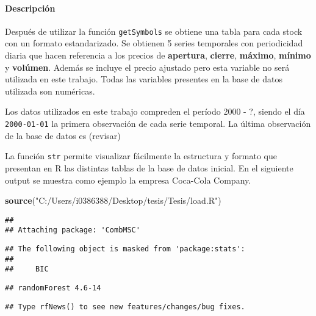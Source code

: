 \documentclass[]{article}
\newenvironment{Shaded}{\begin{snugshade}}{\end{snugshade}}
\newcommand{\KeywordTok}[1]{\textcolor[rgb]{0.13,0.29,0.53}{\textbf{#1}}}
\newcommand{\NormalTok}[1]{#1}
\newcommand{\StringTok}[1]{\textcolor[rgb]{0.31,0.60,0.02}{#1}}
\let\oldparagraph\paragraph
\renewcommand{\paragraph}[1]{\oldparagraph{#1}\mbox{}}
\begin{document}
\hypertarget{descripcion}{%
\paragraph{Descripción}\label{descripcion}}

Después de utilizar la función \texttt{getSymbols} se obtiene una tabla
para cada stock con un formato estandarizado. Se obtienen 5 series
temporales con periodicidad diaria que hacen referencia a los precios de
\textbf{apertura}, \textbf{cierre}, \textbf{máximo}, \textbf{mínimo} y
\textbf{volúmen}. Además se incluye el precio ajustado pero esta
variable no será utilizada en este trabajo. Todas las variables
presentes en la base de datos utilizada son numéricas.

\setlength\parskip{5ex}
\justifying

Los datos utilizados en este trabajo compreden el período 2000 - ?,
siendo el día \texttt{2000-01-01} la primera observación de cada serie
temporal. La última observación de la base de datos es (revisar)

\setlength\parskip{5ex}
\justifying

La función \texttt{str} permite visualizar fácilmente la estructura y
formato que presentan en R las distintas tablas de la base de datos
inicial. En el siguiente output se muestra como ejemplo la empresa
Coca-Cola Company.

\centering

\begin{Shaded}
\begin{Highlighting}[]
\KeywordTok{source}\NormalTok{(}\StringTok{"C:/Users/i0386388/Desktop/tesis/Tesis/load.R"}\NormalTok{)}
\end{Highlighting}
\end{Shaded}

\begin{verbatim}
## 
## Attaching package: 'CombMSC'
\end{verbatim}

\begin{verbatim}
## The following object is masked from 'package:stats':
## 
##     BIC
\end{verbatim}

\begin{verbatim}
## randomForest 4.6-14
\end{verbatim}

\begin{verbatim}
## Type rfNews() to see new features/changes/bug fixes.
\end{verbatim}
\end{document}
